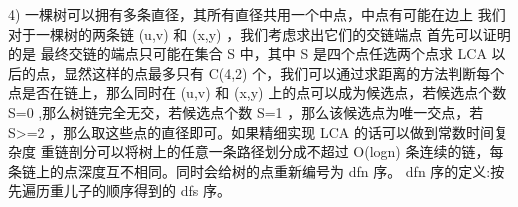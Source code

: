 {}\markdownRendererDollarSign{} 4) \markdownRendererDollarSign{}一棵树可以拥有多条直径，其所有直径共用一个中点，中点有可能在边上\markdownRendererInterblockSeparator
{}
\markdownRendererSectionEnd \markdownRendererSectionBegin
{}\markdownRendererInterblockSeparator
{}我们对于一棵树的两条链\markdownRendererDollarSign{} (u,v) \markdownRendererDollarSign{}和\markdownRendererDollarSign{} (x,y) \markdownRendererDollarSign{}，我们考虑求出它们的交链端点\markdownRendererParagraphSeparator
{}首先可以证明的是 最终交链的端点只可能在集合\markdownRendererDollarSign{} S \markdownRendererDollarSign{}中，其中\markdownRendererDollarSign{} S \markdownRendererDollarSign{}是四个点任选两个点求\markdownRendererDollarSign{} LCA \markdownRendererDollarSign{}以后的点，显然这样的点最多只有\markdownRendererDollarSign{} C(4,2) \markdownRendererDollarSign{}个，我们可以通过求距离的方法判断每个点是否在链上，那么同时在\markdownRendererDollarSign{} (u,v) \markdownRendererDollarSign{}和\markdownRendererDollarSign{} (x,y) \markdownRendererDollarSign{}上的点可以成为候选点，若候选点个数\markdownRendererDollarSign{} \markdownRendererPipe{}S\markdownRendererPipe{}=0 \markdownRendererDollarSign{},那么树链完全无交，若候选点个数\markdownRendererDollarSign{} \markdownRendererPipe{}S\markdownRendererPipe{}=1 \markdownRendererDollarSign{}，那么该候选点为唯一交点，若\markdownRendererDollarSign{} \markdownRendererPipe{}S\markdownRendererPipe{}>=2 \markdownRendererDollarSign{}，那么取这些点的直径即可。如果精细实现\markdownRendererDollarSign{} LCA \markdownRendererDollarSign{}的话可以做到常数时间复杂度\markdownRendererInterblockSeparator
{}\markdownRendererInterblockSeparator
{}
\markdownRendererSectionEnd \markdownRendererSectionBegin
{}\markdownRendererInterblockSeparator
{}重链剖分可以将树上的任意一条路径划分成不超过\markdownRendererDollarSign{} O(logn) \markdownRendererDollarSign{}条连续的链，每条链上的点深度互不相同。同时会给树的点重新编号为\markdownRendererDollarSign{} dfn \markdownRendererDollarSign{}序。\markdownRendererParagraphSeparator
{}\markdownRendererDollarSign{} dfn \markdownRendererDollarSign{}序的定义:按先遍历重儿子的顺序得到的\markdownRendererDollarSign{} dfs \markdownRendererDollarSign{}序。\markdownRendererParagraphSeparator
